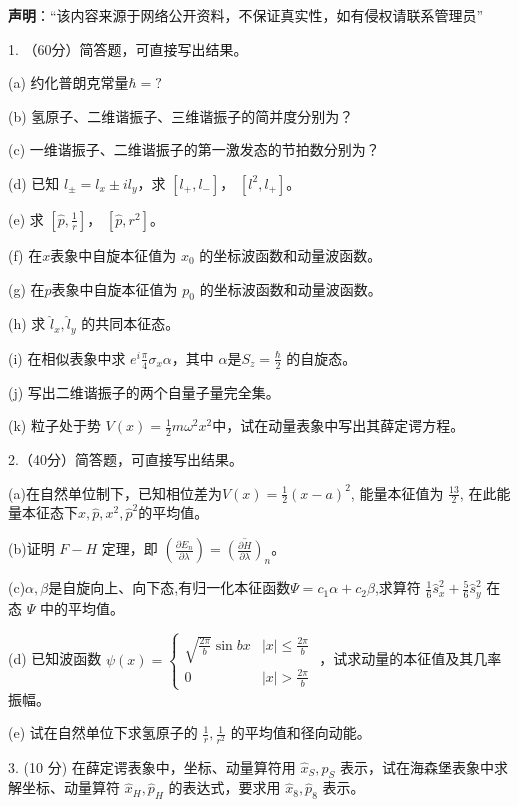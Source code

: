 
\textbf{声明}：“该内容来源于网络公开资料，不保证真实性，如有侵权请联系管理员”

1. （60分）简答题，可直接写出结果。

(a) 约化普朗克常量$\hbar = ?$

(b) 氢原子、二维谐振子、三维谐振子的简并度分别为？

(c) 一维谐振子、二维谐振子的第一激发态的节拍数分别为？

(d) 已知 $l_\pm = l_x \pm il_y $，求 $[l_+, l_-]$， $[l^2, l_+]$。

(e) 求 $[\hat p, \frac{1}{r}]$， $[\hat p, r^2]$。

(f) 在$x$表象中自旋本征值为 $x_0$ 的坐标波函数和动量波函数。

(g) 在$p$表象中自旋本征值为 $p_0$ 的坐标波函数和动量波函数。

(h) 求 $\hat l_x,\hat l_y$ 的共同本征态。

(i) 在相似表象中求 $e^i\frac{\pi}{4}\sigma_x\alpha$，其中 $\alpha$是$S_z =\frac{\hbar}{2} $ 的自旋态。

(j) 写出二维谐振子的两个自量子量完全集。

(k) 粒子处于势 $V(x) = \frac{1}{2}m\omega^2x^2$中，试在动量表象中写出其薛定谔方程。

2.（40分）简答题，可直接写出结果。

(a)在自然单位制下，已知相位差为$V(x) = \frac{1}{2} (x-a)^2$, 能量本征值为 $\frac{13}{2}$, 在此能量本征态下$x,\hat p,x^2,\hat p^2$的平均值。

(b)证明 $F-H$ 定理，即 
$\left( \frac{\partial E_{n}}{\partial \lambda} \right) = \overline{(\frac{\partial H}{\partial \lambda})} _n$。

(c)$\alpha,\beta$是自旋向上、向下态,有归一化本征函数$\Psi=c_1\alpha+c_2\beta$,求算符 $\frac{1}{6}\hat s_x^2 + \frac{5}{6}\hat s_y^2$ 在态 $\Psi$ 中的平均值。

(d) 已知波函数 $\psi(x) = 
\begin{cases} 
\sqrt{\frac{2\pi}{b}} \sin{bx} & |x| \leq \frac{2\pi}{b} \\
0 & |x| > \frac{2\pi}{b} 
\end{cases}$ ，试求动量的本征值及其几率振幅。

(e) 试在自然单位下求氢原子的 $\frac{1}{r},\frac{1}{r^2}$ 的平均值和径向动能。

3. (10 分) 在薛定谔表象中，坐标、动量算符用 $\hat x_S,\hat p_S$ 表示，试在海森堡表象中求解坐标、动量算符 $\hat x_H, \hat p_{H}$ 的表达式，要求用 $\hat x_8,\hat p_8$ 表示。

